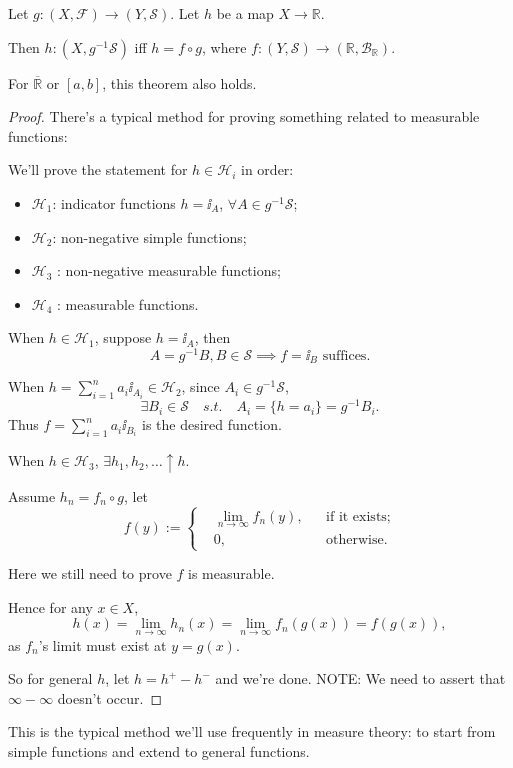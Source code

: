 \begin{theorem}
    Let $g: (X,\mathscr{F})\to (Y,\mathscr{S})$. Let $h$ be a map $X\to \mathbb{R}$.

	Then $h:(X, g^{-1}\mathscr{S})$ iff  $h = f\circ g$,
	where $f:(Y,\mathscr{S})\to(\mathbb{R}, \mathscr{B}_{\mathbb{R}})$.
\end{theorem}
\begin{remark}
	For $\overline{\mathbb{R}}$ or $[a,b]$, this theorem also holds.
\end{remark}
\begin{proof}[Proof]
    There's a typical method for proving something related to measurable functions:

	We'll prove the statement for $h\in \mathcal{H}_i$ in order:
	\begin{itemize}
		\item $ \mathcal{H}_1$: indicator functions $h=\ii_A$,
			$\forall A\in g^{-1}\mathscr{S}$;
		\item $\mathcal{H}_2$: non-negative simple functions;
		\item $\mathcal{H}_3$ : non-negative measurable functions;
		\item $ \mathcal{H}_4$ : measurable functions.
	\end{itemize}

	When $h\in \mathcal{H}_1$, suppose $h=\ii_A$, then
	 \[
	A = g^{-1} B, B\in \mathscr{S}\implies f = \ii_B \text{ suffices.}
	\]

	When $h = \sum_{i=1}^n a_i\ii_{A_i}\in \mathcal{H}_2$,
	since $A_i\in g^{-1}\mathscr{S}$,
	\[
	\exists B_i\in \mathscr{S}\quad s.t.\quad A_i = \{h = a_i\} = g^{-1}B_i.
	\]
	Thus $f = \sum_{i=1}^n a_i\ii_{B_i}$ is the desired function.

	When $h\in \mathcal{H}_3$, $\exists h_1,h_2,\dots\uparrow h$.

	Assume $h_n = f_n\circ g$, let
	 \[
	f(y) := \left\{
	\begin{aligned}
		&\lim_{n\to \infty}f_n(y), &&\text{if it exists;}\\
		&0, &&\text{otherwise.}
	\end{aligned}\right.
	\]
	\begin{remark}
	    Here we still need to prove $f$ is measurable.
	\end{remark}
	Hence for any $x\in X$,
	\[
		h(x) = \lim_{n\to \infty} h_n(x)
		= \lim_{n\to \infty}f_n(g(x)) = f(g(x)),
	\]
	as $f_n$'s limit must exist at  $y=g(x)$.

	So for general $h$, let $h = h^+ - h^-$ and we're done.
	NOTE: We need to assert that $\infty-\infty$ doesn't occur.
\end{proof}
\begin{remark}
    This is the typical method we'll use frequently in measure theory:
	to start from simple functions and extend to general functions.
\end{remark}
